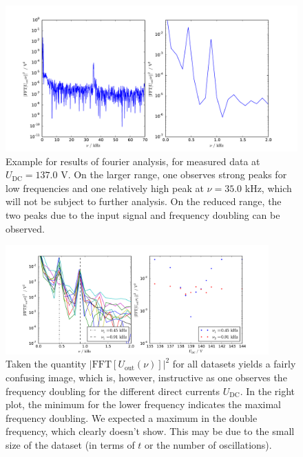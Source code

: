 \begin{figure}
\includegraphics[width=\pltw]{figures/fft_example.pdf}
\caption{
    Example for results of fourier analysis, for measured data at 
    $U_\mathrm{DC} = 137.0$ V.
    On the larger range, one observes strong peaks for low frequencies 
    and one relatively high peak at $\nu = 35.0$ kHz, which will not be 
    subject to further analysis. On the reduced range, the two peaks 
    due to the input signal and frequency doubling can be observed. 
    }
\label{fig:fourier_example}
\end{figure}

\begin{figure}
\includegraphics[width=0.9\textwidth]{figures/fft_all.pdf}
\caption{
    Taken the quantity
    $|\mathrm{FFT}\left[U_\mathrm{out} \left(\nu\right)\right]|^2$ 
    for all datasets yields a fairly confusing image, 
    which is, however, instructive as one observes the 
    frequency doubling for the different direct currents 
    $U_\mathrm{DC}$.
    In the right plot, the minimum for the lower frequency indicates 
    the maximal frequency doubling. We expected a maximum in the 
    double frequency, which clearly doesn't show. This 
    may be due to the small size of the dataset (in terms 
        of $t$ or the number of oscillations). 
    }
\label{fig:fft_all}
\end{figure}



